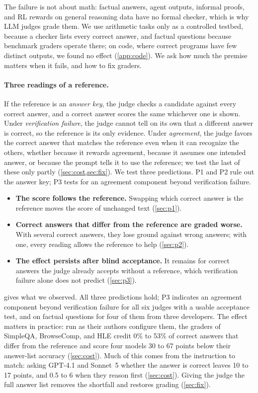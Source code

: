 \documentclass{article}
\begin{document}
The failure is not about math: factual answers, agent outputs, informal proofs, and RL rewards on general reasoning data have no formal checker, which is why LLM judges grade them. We use arithmetic tasks only as a controlled testbed, because a checker lists every correct answer, and factual questions because benchmark graders operate there; on code, where correct programs have few distinct outputs, we found no effect (\cref{app:code}). We ask how much the premise matters when it fails, and how to fix graders.

\paragraph{Three readings of a reference.}
If the reference is an \emph{answer key}, the judge checks a candidate against every correct answer, and a correct answer scores the same whichever one is shown.
Under \emph{verification failure}, the judge cannot tell on its own that a different answer is correct, so the reference is its only evidence.
Under \emph{agreement}, the judge favors the correct answer that matches the reference even when it can recognize the others, whether because it rewards agreement, because it assumes one intended answer, or because the prompt tells it to use the reference; we test the last of these only partly (\cref{sec:cost,sec:fix}).
We test three predictions. P1 and P2 rule out the answer key; P3 tests for an agreement component beyond verification failure.
\begin{itemize}[leftmargin=1.5em,itemsep=2pt,topsep=2pt]
\item[\textbf{P1}] \textbf{The score follows the reference.} Swapping which correct answer is the reference moves the score of unchanged text (\cref{sec:p1}).
\item[\textbf{P2}] \textbf{Correct answers that differ from the reference are graded worse.} With several correct answers, they lose ground against wrong answers; with one, every reading allows the reference to help (\cref{sec:p2}).
\item[\textbf{P3}] \textbf{The effect persists after blind acceptance.} It remains for correct answers the judge already accepts without a reference, which verification failure alone does not predict (\cref{sec:p3}).
\end{itemize}
 gives what we observed. All three predictions hold; P3 indicates an agreement component beyond verification failure for all six judges with a usable acceptance test, and on factual questions for four of them from three developers. The effect matters in practice: run as their authors configure them, the graders of SimpleQA, BrowseComp, and HLE credit 0\% to 53\% of correct answers that differ from the reference and score four models 30 to 67 points below their answer-list accuracy (\cref{sec:cost}). Much of this comes from the instruction to match: asking GPT-4.1 and Sonnet~5 whether the answer is correct leaves 10 to 17 points, and 0.5 to 6 when they reason first (\cref{sec:cost}). Giving the judge the full answer list removes the shortfall and restores grading (\cref{sec:fix}).
\end{document}

